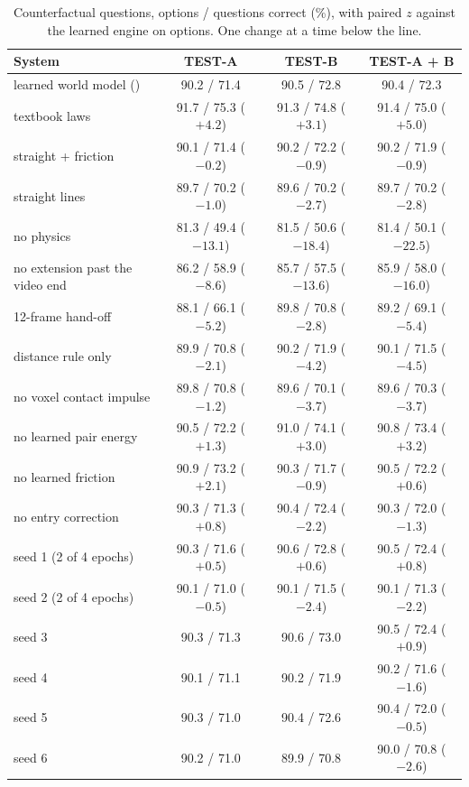\begin{table}[h]
\caption{Counterfactual questions, options / questions correct (\%), with paired $z$ against the learned engine on options. One change at a time below the line.}
\label{tab:full}
\centering
\small
\begin{tabular}{@{}lccc@{}}
\toprule
System & TEST-A & TEST-B & TEST-A + B \\
\midrule
learned world model (\sys{}) & 90.2 / 71.4 & 90.5 / 72.8 & 90.4 / 72.3 \\
textbook laws & 91.7 / 75.3 ($+4.2$) & 91.3 / 74.8 ($+3.1$) & 91.4 / 75.0 ($+5.0$) \\
straight + friction & 90.1 / 71.4 ($-0.2$) & 90.2 / 72.2 ($-0.9$) & 90.2 / 71.9 ($-0.9$) \\
straight lines & 89.7 / 70.2 ($-1.0$) & 89.6 / 70.2 ($-2.7$) & 89.7 / 70.2 ($-2.8$) \\
no physics & 81.3 / 49.4 ($-13.1$) & 81.5 / 50.6 ($-18.4$) & 81.4 / 50.1 ($-22.5$) \\
\midrule
no extension past the video end & 86.2 / 58.9 ($-8.6$) & 85.7 / 57.5 ($-13.6$) & 85.9 / 58.0 ($-16.0$) \\
12-frame hand-off & 88.1 / 66.1 ($-5.2$) & 89.8 / 70.8 ($-2.8$) & 89.2 / 69.1 ($-5.4$) \\
distance rule only & 89.9 / 70.8 ($-2.1$) & 90.2 / 71.9 ($-4.2$) & 90.1 / 71.5 ($-4.5$) \\
no voxel contact impulse & 89.8 / 70.8 ($-1.2$) & 89.6 / 70.1 ($-3.7$) & 89.6 / 70.3 ($-3.7$) \\
no learned pair energy & 90.5 / 72.2 ($+1.3$) & 91.0 / 74.1 ($+3.0$) & 90.8 / 73.4 ($+3.2$) \\
no learned friction & 90.9 / 73.2 ($+2.1$) & 90.3 / 71.7 ($-0.9$) & 90.5 / 72.2 ($+0.6$) \\
no entry correction & 90.3 / 71.3 ($+0.8$) & 90.4 / 72.4 ($-2.2$) & 90.3 / 72.0 ($-1.3$) \\
\midrule
seed 1 (2 of 4 epochs) & 90.3 / 71.6 ($+0.5$) & 90.6 / 72.8 ($+0.6$) & 90.5 / 72.4 ($+0.8$) \\
seed 2 (2 of 4 epochs) & 90.1 / 71.0 ($-0.5$) & 90.1 / 71.5 ($-2.4$) & 90.1 / 71.3 ($-2.2$) \\
seed 3 & 90.3 / 71.3 & 90.6 / 73.0 & 90.5 / 72.4 ($+0.9$) \\
seed 4 & 90.1 / 71.1 & 90.2 / 71.9 & 90.2 / 71.6 ($-1.6$) \\
seed 5 & 90.3 / 71.0 & 90.4 / 72.6 & 90.4 / 72.0 ($-0.5$) \\
seed 6 & 90.2 / 71.0 & 89.9 / 70.8 & 90.0 / 70.8 ($-2.6$) \\
\bottomrule
\end{tabular}
\end{table}

